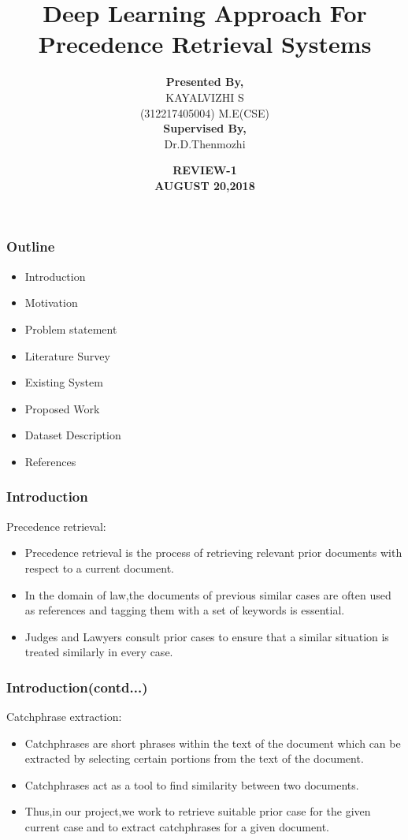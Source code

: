 \documentclass{beamer}
\begin{document}
\title{\textbf{Deep Learning Approach For Precedence Retrieval Systems } }

\author{ \textbf{ Presented By,}\\  KAYALVIZHI S \\(312217405004) M.E(CSE) \\  \textbf{Supervised By,} \\ Dr.D.Thenmozhi}
\date{\textbf{REVIEW-1 \\ AUGUST 20,2018} }


\begin{frame}
\titlepage
\end{frame}


\begin{frame}\frametitle{Outline}
\begin{itemize}
\item Introduction
\item Motivation
\item Problem statement
\item Literature Survey
\item Existing System
\item Proposed Work
\item Dataset Description
\item References
\end{itemize}
\end{frame}



\begin{frame}\frametitle{Introduction}
Precedence retrieval:\\
\begin{itemize}

\item Precedence retrieval is the process of retrieving relevant prior documents with respect to a current document.
\item In the domain of law,the documents of previous similar cases are often used as references and tagging them with a set of keywords is essential.
\item Judges and Lawyers consult prior cases to ensure that a similar situation is treated similarly in every case.
 \end{itemize}
\end{frame}
\begin{frame}\frametitle{Introduction(contd...)}
Catchphrase extraction:\\
	\begin{itemize}		

\item Catchphrases are short phrases within the text of the document which can be extracted by selecting certain portions from the text of the document.
\item Catchphrases act as a tool to find similarity between two documents.
\item Thus,in our project,we work to retrieve suitable prior case for the given current case and to extract catchphrases for a given document.
 \end{itemize}
\end{frame}
\end{document}
